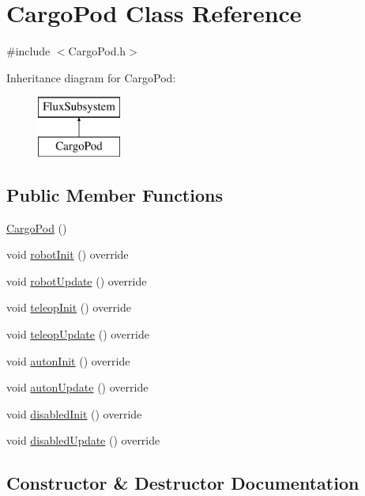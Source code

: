 \hypertarget{classCargoPod}{}\section{Cargo\+Pod Class Reference}
\label{classCargoPod}


{\ttfamily \#include $<$Cargo\+Pod.\+h$>$}

Inheritance diagram for Cargo\+Pod\+:\begin{figure}[H]
\begin{center}
\leavevmode
\includegraphics[height=2.000000cm]{classCargoPod}
\end{center}
\end{figure}
\subsection*{Public Member Functions}
\begin{DoxyCompactItemize}
\item 
\hyperlink{classCargoPod_a2c409cfae64e6c554eb7620f5db213d0}{Cargo\+Pod} ()
\item 
void \hyperlink{classCargoPod_a28aaa86f3e7ee713748f4e9b1a136fd8}{robot\+Init} () override
\item 
void \hyperlink{classCargoPod_a22723a1f9685242aca13e6bc44e3f0a2}{robot\+Update} () override
\item 
void \hyperlink{classCargoPod_a2da82d2620414330cd775ac1c7f0718a}{teleop\+Init} () override
\item 
void \hyperlink{classCargoPod_a29fd74f10b26e3db4348e039969fb173}{teleop\+Update} () override
\item 
void \hyperlink{classCargoPod_a070623c3e9ca5b91765d68b63ccfa1eb}{auton\+Init} () override
\item 
void \hyperlink{classCargoPod_ad11b20da5e057212dedd7a5ef34223b9}{auton\+Update} () override
\item 
void \hyperlink{classCargoPod_a924ef514ed33ea4e7f7ef966f5b83fa7}{disabled\+Init} () override
\item 
void \hyperlink{classCargoPod_a71b58a975ba9f20f4a9023aa3fcbba0e}{disabled\+Update} () override
\end{DoxyCompactItemize}


\subsection{Constructor \& Destructor Documentation}
\mbox{\label{classCargoPod_a2c409cfae64e6c554eb7620f5db213d0}} 
